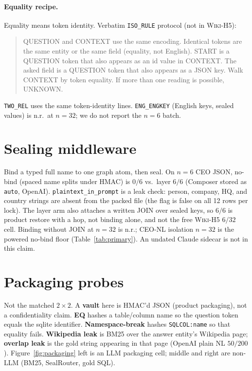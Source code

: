 \documentclass{article}
\begin{document}
\paragraph{Equality recipe.}
\label{app:recipe}
Equality means token identity. Verbatim \texttt{ISO\_RULE} protocol
(not in \textsc{Wiki-H5}):
\begin{quote}
\small
QUESTION and CONTEXT use the same encoding. Identical tokens are the same
entity or the same field (equality, not English). START is a QUESTION token
that also appears as an id value in CONTEXT. The asked field is a QUESTION
token that also appears as a JSON key. Walk CONTEXT by token equality.
If more than one reading is possible, UNKNOWN.
\end{quote}
\texttt{TWO\_REL} uses the same token-identity lines.
\texttt{ENG\_ENGKEY} (English keys, sealed values) is n.r.\ at $n{=}32$;
we do not report the $n{=}6$ batch.

\section{Sealing middleware}
\label{app:middleware}

Bind a typed full name to one graph atom, then seal.
On $n{=}6$ CEO JSON, no-bind (spaced name splits under HMAC) is $0/6$ vs.\
layer $6/6$ (Composer stored as \texttt{auto}, OpenAI).
\texttt{plaintext\_in\_prompt} is a leak check: person, company, HQ, and
country strings are absent from the packed file (the flag is false on all
12 rows per lock).
The layer arm also attaches a written JOIN over sealed keys, so $6/6$ is
product restore with a hop, not binding alone, and not the free
\textsc{Wiki-H5} $6/32$ cell.
Binding without JOIN at $n{=}32$ is n.r.; CEO-NL isolation $n{=}32$ is the
powered no-bind floor (Table~\ref{tab:primary}).
An undated Claude sidecar is not in this claim.

\section{Packaging probes}
\label{app:packaging}

Not the matched $2{\times}2$.
A \textbf{vault} here is HMAC'd JSON (product packaging), not a
confidentiality claim.
\textbf{EQ} hashes a table/column name so the question token equals the
sqlite identifier.
\textbf{Namespace-break} hashes \texttt{SQLCOL:name} so that equality
fails.
\textbf{Wikipedia leak} is BM25 over the answer entity's Wikipedia page;
\textbf{overlap leak} is the gold string appearing in that page (OpenAI
plain NL $50/200$).
Figure~\ref{fig:packaging} left is an LLM packaging cell; middle and right
are non-LLM (BM25, SealRouter, gold SQL).
\end{document}
